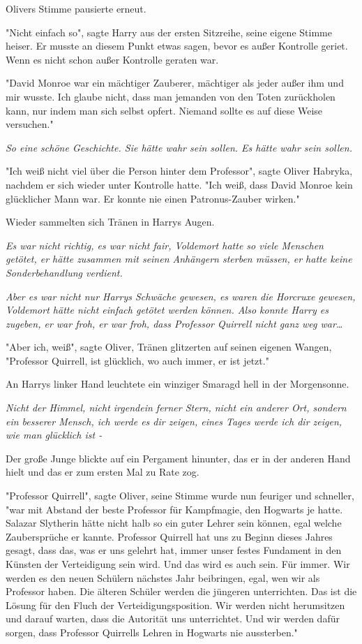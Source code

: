 {Olivers Stimme pausierte erneut.

"Nicht einfach so", sagte Harry aus der ersten Sitzreihe, seine eigene Stimme heiser. Er musste an diesem Punkt etwas sagen, bevor es außer Kontrolle geriet. Wenn es nicht schon außer Kontrolle geraten war.

"David Monroe war ein mächtiger Zauberer, mächtiger als jeder außer ihm und mir wusste. Ich glaube nicht, dass man jemanden von den Toten zurückholen kann, nur indem man sich selbst opfert. Niemand sollte es auf diese Weise versuchen."

\emph{So eine schöne Geschichte. Sie hätte wahr sein sollen. Es hätte wahr sein sollen.}

"Ich weiß nicht viel über die Person hinter dem Professor", sagte Oliver Habryka, nachdem er sich wieder unter Kontrolle hatte. "Ich weiß, dass David Monroe kein glücklicher Mann war. Er konnte nie einen Patronus-Zauber wirken."

Wieder sammelten sich Tränen in Harrys Augen.

\emph{Es war nicht richtig, es war nicht fair, Voldemort hatte so viele Menschen getötet, er hätte zusammen mit seinen Anhängern sterben müssen, er hatte keine Sonderbehandlung verdient.}

\emph{Aber es war nicht nur Harrys Schwäche gewesen, es waren die Horcruxe gewesen, Voldemort hätte nicht einfach getötet werden können. Also konnte Harry es zugeben, er war froh, er war froh, dass Professor Quirrell nicht ganz weg war…}

"Aber ich, weiß", sagte Oliver, Tränen glitzerten auf seinen eigenen Wangen, "Professor Quirrell, ist glücklich, wo auch immer, er ist jetzt."

An Harrys linker Hand leuchtete ein winziger Smaragd hell in der Morgensonne.

\emph{Nicht der Himmel, nicht irgendein ferner Stern, nicht ein anderer Ort, sondern ein besserer Mensch, ich werde es dir zeigen, eines Tages werde ich dir zeigen, wie man glücklich ist -}

Der große Junge blickte auf ein Pergament hinunter, das er in der anderen Hand hielt und das er zum ersten Mal zu Rate zog.

"Professor Quirrell", sagte Oliver, seine Stimme wurde nun feuriger und schneller, "war mit Abstand der beste Professor für Kampfmagie, den Hogwarts je hatte. Salazar Slytherin hätte nicht halb so ein guter Lehrer sein können, egal welche Zaubersprüche er kannte. Professor Quirrell hat uns zu Beginn dieses Jahres gesagt, dass das, was er uns gelehrt hat, immer unser festes Fundament in den Künsten der Verteidigung sein wird. Und das wird es auch sein. Für immer. Wir werden es den neuen Schülern nächstes Jahr beibringen, egal, wen wir als Professor haben. Die älteren Schüler werden die jüngeren unterrichten. Das ist die Lösung für den Fluch der Verteidigungsposition. Wir werden nicht herumsitzen und darauf warten, dass die Autorität uns unterrichtet. Und wir werden dafür sorgen, dass Professor Quirrells Lehren in Hogwarts nie aussterben."

}
